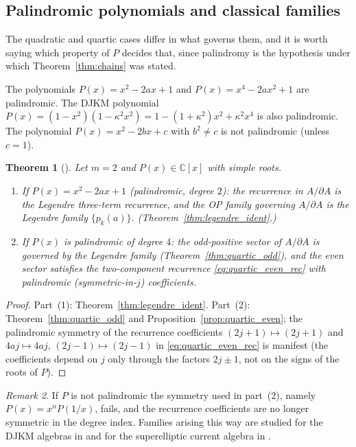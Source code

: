 \documentclass[11pt]{amsart}
\newtheorem{theorem}{Theorem}[section]
\theoremstyle{definition}
\theoremstyle{remark}
\newtheorem{remark}[theorem]{Remark}
\newcommand{\C}{\mathbb{C}}
\newcommand{\pa}{\partial}
\begin{document}

\subsection{Palindromic polynomials and classical families}

The quadratic and quartic cases differ in what governs them, and it is worth
saying which property of $P$ decides that, since palindromy is the hypothesis
under which Theorem~\ref{thm:chains} was stated.

The polynomials $P(x) = x^2-2ax+1$ and $P(x) = x^4-2ax^2+1$
are palindromic.
The DJKM polynomial $P(x) = (1-x^2)(1-\kappa^2x^2)
= 1-(1+\kappa^2)x^2+\kappa^2x^4$ is also palindromic.
The polynomial $P(x) = x^2-2bx+c$ with $b^2\neq c$ is not palindromic
(unless $c=1$).

\begin{theorem}[{\cite[\S2.2, \S2.4]{CoxZhao2018}}]
\label{thm:palindromic}
Let $m=2$ and $P(x)\in\C[x]$ with simple roots.
\begin{enumerate}
\item If $P(x) = x^2-2ax+1$ (palindromic, degree $2$):
  the recurrence in $A/\pa A$ is the Legendre three-term recurrence,
  and the OP family governing $A/\pa A$ is the Legendre family $\{p_k(a)\}$.
  (Theorem~\ref{thm:legendre_ident}.)

\item If $P(x)$ is palindromic of degree $4$:
  the odd-positive sector of $A/\pa A$ is governed by the Legendre family
  (Theorem~\ref{thm:quartic_odd}), and the even sector satisfies
  the two-component recurrence \eqref{eq:quartic_even_rec}
  with palindromic (symmetric-in-$j$) coefficients.

\end{enumerate}
\end{theorem}

\begin{proof}
Part~(1): Theorem~\ref{thm:legendre_ident}.
Part~(2): Theorem~\ref{thm:quartic_odd} and Proposition~\ref{prop:quartic_even};
the palindromic symmetry of the recurrence coefficients
$(2j+1)\mapsto (2j+1)$ and $4aj\mapsto 4aj$, $(2j-1)\mapsto (2j-1)$
in \eqref{eq:quartic_even_rec} is manifest (the coefficients depend
on $j$ only through the factors $2j\pm 1$, not on the signs of the
roots of $P$).
\end{proof}

\begin{remark}
If $P$ is not palindromic the symmetry used in part~(2), namely
$P(x)=x^{n}P(1/x)$, fails, and the recurrence coefficients are no longer
symmetric in the degree index. Families arising this way are studied for the
DJKM algebras in \cite{CoxFutornyTirao2013} and for the superelliptic current
algebra in \cite{SantosNeklyudovFutorny2025}.
\end{remark}
\end{document}
